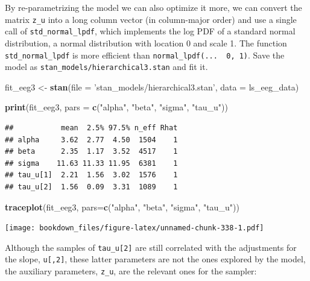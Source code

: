 \documentclass[12pt,]{krantz}
\newenvironment{Shaded}{\begin{snugshade}}{\end{snugshade}}
\newcommand{\DataTypeTok}[1]{\textcolor[rgb]{0.13,0.29,0.53}{#1}}
\newcommand{\KeywordTok}[1]{\textcolor[rgb]{0.13,0.29,0.53}{\textbf{#1}}}
\newcommand{\NormalTok}[1]{#1}
\newcommand{\StringTok}[1]{\textcolor[rgb]{0.31,0.60,0.02}{#1}}
\theoremstyle{definition}
\theoremstyle{definition}
\theoremstyle{definition}
\theoremstyle{remark}
\begin{document}
By re-parametrizing the model we can also optimize it more, we can convert the matrix \texttt{z\_u} into a long column vector (in column-major order) and use a single call of \texttt{std\_normal\_lpdf}, which implements the log PDF of a standard normal distribution, a normal distribution with location 0 and scale 1. The function \texttt{std\_normal\_lpdf} is more efficient than \texttt{normal\_lpdf(...\ \textbar{}\ 0,\ 1)}. Save the model as \texttt{stan\_models/hierarchical3.stan} and fit it.

\begin{Shaded}
\begin{Highlighting}[]
\NormalTok{fit_eeg3 <-}\StringTok{ }\KeywordTok{stan}\NormalTok{(}\DataTypeTok{file =} \StringTok{'stan_models/hierarchical3.stan'}\NormalTok{, }
                 \DataTypeTok{data =}\NormalTok{ ls_eeg_data)}
\end{Highlighting}
\end{Shaded}

\begin{Shaded}
\begin{Highlighting}[]
\KeywordTok{print}\NormalTok{(fit_eeg3, }\DataTypeTok{pars =} \KeywordTok{c}\NormalTok{(}\StringTok{"alpha"}\NormalTok{, }\StringTok{"beta"}\NormalTok{, }\StringTok{"sigma"}\NormalTok{, }\StringTok{"tau_u"}\NormalTok{))}
\end{Highlighting}
\end{Shaded}

\begin{verbatim}
##           mean  2.5% 97.5% n_eff Rhat
## alpha     3.62  2.77  4.50  1504    1
## beta      2.35  1.17  3.52  4517    1
## sigma    11.63 11.33 11.95  6381    1
## tau_u[1]  2.21  1.56  3.02  1576    1
## tau_u[2]  1.56  0.09  3.31  1089    1
\end{verbatim}

\begin{Shaded}
\begin{Highlighting}[]
\KeywordTok{traceplot}\NormalTok{(fit_eeg3, }\DataTypeTok{pars=}\KeywordTok{c}\NormalTok{(}\StringTok{"alpha"}\NormalTok{, }\StringTok{"beta"}\NormalTok{, }\StringTok{"sigma"}\NormalTok{, }\StringTok{"tau_u"}\NormalTok{))}
\end{Highlighting}
\end{Shaded}

\texttt{[image: bookdown\_files/figure-latex/unnamed-chunk-338-1.pdf]}

Although the samples of \texttt{tau\_u{[}2{]}} are still correlated with the adjustments for the slope, \texttt{u{[},2{]}}, these latter parameters are not the ones explored by the model, the auxiliary parameters, \texttt{z\_u}, are the relevant ones for the sampler:
\end{document}
